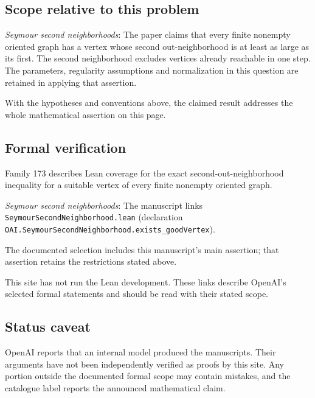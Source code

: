 \documentclass[11pt]{article}
\begin{document}
\subsection{Scope relative to this problem}
\textit{Seymour second neighborhoods}: The paper claims that every finite nonempty oriented graph has a vertex whose second out-neighborhood is at least as large as its first. The second neighborhood excludes vertices already reachable in one step. The parameters, regularity assumptions and normalization in this question are retained in applying that assertion.

With the hypotheses and conventions above, the claimed result addresses the whole mathematical assertion on this page.

\subsection{Formal verification}
Family 173 describes Lean coverage for the exact second-out-neighborhood inequality for a suitable vertex of every finite nonempty oriented graph.

\textit{Seymour second neighborhoods}: The manuscript links \texttt{SeymourSecondNeighborhood.lean} (declaration \texttt{OAI.SeymourSecondNeighborhood.exists\_goodVertex}).

The documented selection includes this manuscript’s main assertion; that assertion retains the restrictions stated above.

This site has not run the Lean development. These links describe OpenAI’s selected formal statements and should be read with their stated scope.

\subsection{Status caveat}
OpenAI reports that an internal model produced the manuscripts. Their arguments have not been independently verified as proofs by this site. Any portion outside the documented formal scope may contain mistakes, and the catalogue label reports the announced mathematical claim.
\end{document}
